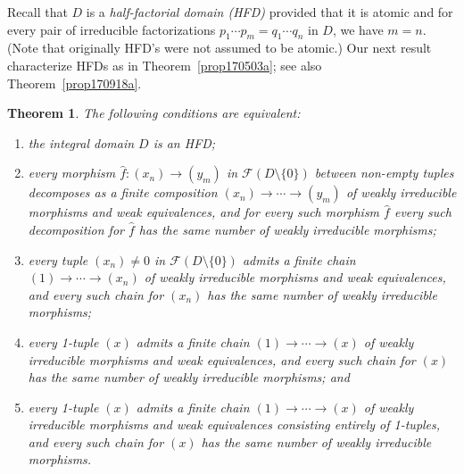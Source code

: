 \documentclass[reqno]{amsart}
\theoremstyle{plain}
\newtheorem{thm}[lem]{Theorem}
\theoremstyle{definition}
\newcommand{\cat}[1]{\mathcal{#1}}
\newcommand{\catf}{\cat{F}}
\newcommand{\emptytuple}{\mathfrak{0}}
\numberwithin{equation}{lem}
\begin{document}
Recall that  $D$ is a \emph{half-factorial domain (HFD)}
provided that it is atomic and for every pair of irreducible factorizations $p_1\cdots p_m=q_1\cdots q_n$ in $D$,
we have $m=n$. (Note that originally HFD's were not assumed to be atomic.)
Our next result characterize HFDs
as in Theorem~\ref{prop170503a};
see also Theorem~\ref{prop170918a}.

 
\begin{thm}\label{prop170503d}
The following conditions are equivalent:
\begin{enumerate}[\rm(i)]
\item\label{prop170503d1}
the integral domain $D$ is an HFD;
\item\label{prop170503d2'}
every morphism $\hat f\colon (x_n)\to(y_m)$ in $\catf(D \setminus \{0\})$ between non-empty tuples decomposes as a finite composition
$(x_n)\to\cdots\to(y_m)$ of 
weakly
irreducible morphisms and weak equivalences,
and for every such
morphism $\hat f$  every such decomposition
for $\hat f$ has the same number of 
weakly
irreducible morphisms;
\item\label{prop170503d2}
every tuple $(x_n)\neq\emptytuple$ in $\catf(D \setminus \{0\})$ admits a finite chain
$(1)\to\cdots\to(x_n)$ of 
weakly
irreducible morphisms and weak equivalences, and every such chain
for $(x_n)$ has the same number of 
weakly
irreducible morphisms; 
\item\label{prop170503d3}
every 1-tuple $(x)$ admits a finite chain
$(1)\to\cdots\to(x)$ of 
weakly
irreducible morphisms and weak equivalences, and every such chain
for $(x)$ has the same number of 
weakly
irreducible morphisms; and
\item\label{prop170503d3'}
every 1-tuple $(x)$ admits a finite chain
$(1)\to\cdots\to(x)$ of 
weakly
irreducible morphisms and weak equivalences consisting entirely of 1-tuples, and every such chain
for $(x)$ has the same number of 
weakly
irreducible morphisms.
\end{enumerate}
\end{thm}
\end{document}
